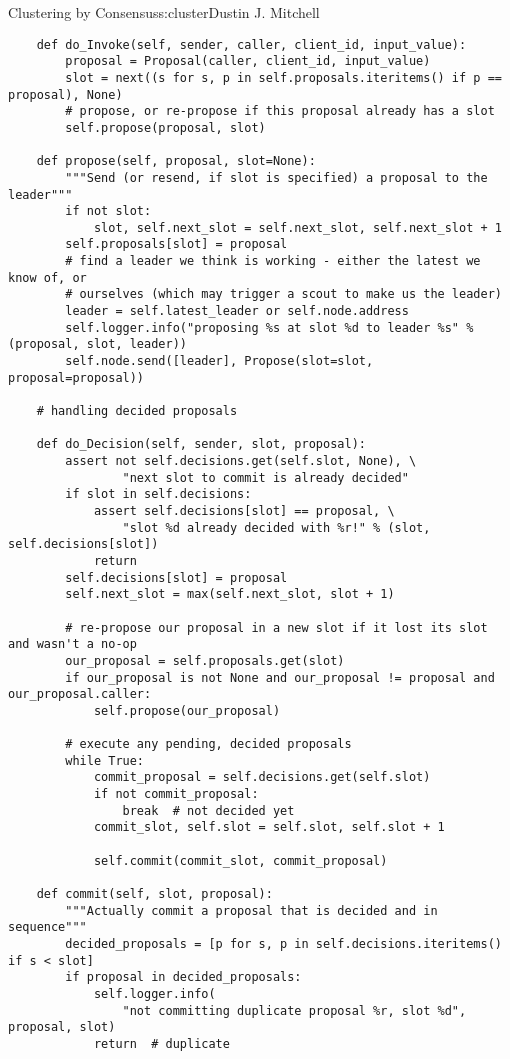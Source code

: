 \begin{aosachapter}{Clustering by Consensus}{s:cluster}{Dustin J. Mitchell}
\begin{verbatim}
    def do_Invoke(self, sender, caller, client_id, input_value):
        proposal = Proposal(caller, client_id, input_value)
        slot = next((s for s, p in self.proposals.iteritems() if p == proposal), None)
        # propose, or re-propose if this proposal already has a slot
        self.propose(proposal, slot)

    def propose(self, proposal, slot=None):
        """Send (or resend, if slot is specified) a proposal to the leader"""
        if not slot:
            slot, self.next_slot = self.next_slot, self.next_slot + 1
        self.proposals[slot] = proposal
        # find a leader we think is working - either the latest we know of, or
        # ourselves (which may trigger a scout to make us the leader)
        leader = self.latest_leader or self.node.address
        self.logger.info("proposing %s at slot %d to leader %s" % (proposal, slot, leader))
        self.node.send([leader], Propose(slot=slot, proposal=proposal))

    # handling decided proposals

    def do_Decision(self, sender, slot, proposal):
        assert not self.decisions.get(self.slot, None), \
                "next slot to commit is already decided"
        if slot in self.decisions:
            assert self.decisions[slot] == proposal, \
                "slot %d already decided with %r!" % (slot, self.decisions[slot])
            return
        self.decisions[slot] = proposal
        self.next_slot = max(self.next_slot, slot + 1)

        # re-propose our proposal in a new slot if it lost its slot and wasn't a no-op
        our_proposal = self.proposals.get(slot)
        if our_proposal is not None and our_proposal != proposal and our_proposal.caller:
            self.propose(our_proposal)

        # execute any pending, decided proposals
        while True:
            commit_proposal = self.decisions.get(self.slot)
            if not commit_proposal:
                break  # not decided yet
            commit_slot, self.slot = self.slot, self.slot + 1

            self.commit(commit_slot, commit_proposal)

    def commit(self, slot, proposal):
        """Actually commit a proposal that is decided and in sequence"""
        decided_proposals = [p for s, p in self.decisions.iteritems() if s < slot]
        if proposal in decided_proposals:
            self.logger.info(
                "not committing duplicate proposal %r, slot %d", proposal, slot)
            return  # duplicate


\end{verbatim}
\end{aosachapter}
